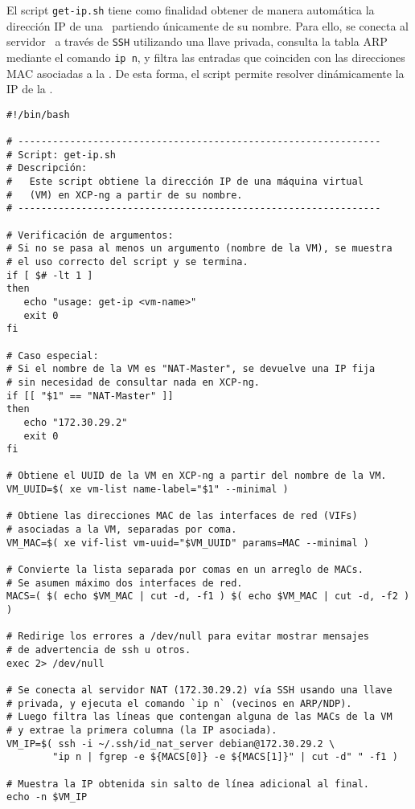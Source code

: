 El script \texttt{get-ip.sh} tiene como finalidad obtener de manera automática la dirección IP de una \VM\, partiendo únicamente de su nombre. Para ello, se conecta al servidor \NAT\ a través de \texttt{SSH} utilizando una llave privada, consulta la tabla ARP mediante el comando \texttt{ip n}, y filtra las entradas que coinciden con las direcciones MAC asociadas a la \VM. De esta forma, el script permite resolver dinámicamente la IP de la \VM.

\begin{verbatim}
#!/bin/bash

# ---------------------------------------------------------------
# Script: get-ip.sh
# Descripción:
#   Este script obtiene la dirección IP de una máquina virtual 
#   (VM) en XCP-ng a partir de su nombre.
# ---------------------------------------------------------------

# Verificación de argumentos:
# Si no se pasa al menos un argumento (nombre de la VM), se muestra 
# el uso correcto del script y se termina.
if [ $# -lt 1 ]
then
   echo "usage: get-ip <vm-name>"
   exit 0
fi

# Caso especial: 
# Si el nombre de la VM es "NAT-Master", se devuelve una IP fija 
# sin necesidad de consultar nada en XCP-ng.
if [[ "$1" == "NAT-Master" ]]
then
   echo "172.30.29.2"
   exit 0
fi

# Obtiene el UUID de la VM en XCP-ng a partir del nombre de la VM.
VM_UUID=$( xe vm-list name-label="$1" --minimal )

# Obtiene las direcciones MAC de las interfaces de red (VIFs) 
# asociadas a la VM, separadas por coma.
VM_MAC=$( xe vif-list vm-uuid="$VM_UUID" params=MAC --minimal )

# Convierte la lista separada por comas en un arreglo de MACs. 
# Se asumen máximo dos interfaces de red.
MACS=( $( echo $VM_MAC | cut -d, -f1 ) $( echo $VM_MAC | cut -d, -f2 ) )

# Redirige los errores a /dev/null para evitar mostrar mensajes 
# de advertencia de ssh u otros.
exec 2> /dev/null

# Se conecta al servidor NAT (172.30.29.2) vía SSH usando una llave 
# privada, y ejecuta el comando `ip n` (vecinos en ARP/NDP).
# Luego filtra las líneas que contengan alguna de las MACs de la VM 
# y extrae la primera columna (la IP asociada).
VM_IP=$( ssh -i ~/.ssh/id_nat_server debian@172.30.29.2 \
        "ip n | fgrep -e ${MACS[0]} -e ${MACS[1]}" | cut -d" " -f1 )

# Muestra la IP obtenida sin salto de línea adicional al final.
echo -n $VM_IP
\end{verbatim}
